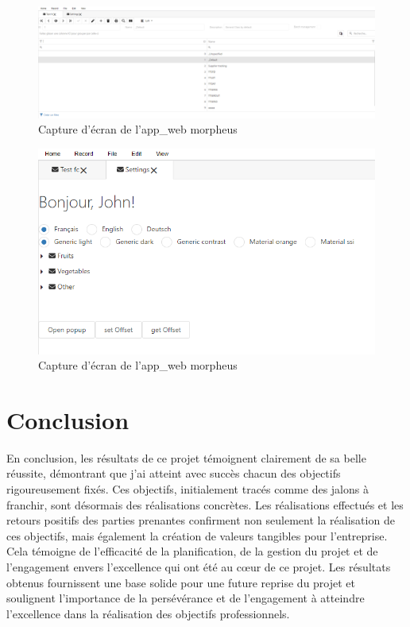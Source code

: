 \documentclass[a4paper, 12pt, french]{article}
\begin{document}
				\begin{figure}[ht!]
					\begin{center}
						\includegraphics[width=\linewidth]{images/mph_web_reactts_1.png}
					\end{center}
					\caption{Capture d'écran de l'\gls{app_web} morpheus}
					\label{fig:mph_web1}
				\end{figure}

				\begin{figure}[ht!]
					\begin{center}
						\includegraphics[width=\linewidth]{images/mph_web_reactts_2.png}
					\end{center}
					\caption{Capture d'écran de l'\gls{app_web} morpheus}
					\label{fig:mph_web2}
				\end{figure}
			\newpage
			\section{Conclusion}
					En conclusion, les résultats de ce projet témoignent clairement de sa belle réussite, démontrant que j'ai atteint avec succès chacun des objectifs rigoureusement fixés. Ces objectifs, initialement tracés comme des jalons à franchir, sont désormais des réalisations concrètes. Les réalisations effectués et les retours positifs des parties prenantes confirment non seulement la réalisation de ces objectifs, mais également la création de valeurs tangibles pour l'entreprise. Cela témoigne de l'efficacité de la planification, de la gestion du projet et de l'engagement envers l'excellence qui ont été au cœur de ce projet. Les résultats obtenus fournissent une base solide pour une future reprise du projet et soulignent l'importance de la persévérance et de l'engagement à atteindre l'excellence dans la réalisation des objectifs professionnels.
		
\end{document}
